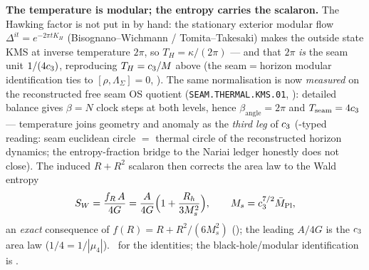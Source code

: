 \par\smallskip\noindent\textbf{The temperature is modular; the entropy carries the scalaron.}
 The Hawking factor is not put in by hand: the stationary exterior
modular flow $\Delta^{it}=e^{-2\pi t K_H}$ (Bisognano--Wichmann / Tomita--Takesaki) makes the outside state
KMS at inverse temperature $2\pi$, so $T_H=\kappa/(2\pi)$ --- and that $2\pi$ \emph{is} the seam unit
$1/(4c_3)$, reproducing $T_H=c_3/M$ above (the seam$=$horizon modular identification ties to
$[\rho,\Lambda_\Sigma]=0$, ).
The same normalisation is now \emph{measured} on the reconstructed free seam OS quotient
(\texttt{SEAM.THERMAL.KMS.01}, ): detailed balance
gives $\beta=N$ clock steps at both levels, hence $\beta_{\mathrm{angle}}=2\pi$ and
$T_{\mathrm{seam}}=4c_3$ --- temperature joins geometry and anomaly as the \emph{third leg}
of $c_3$ (\mC-typed reading: seam euclidean circle $=$ thermal circle of the reconstructed
horizon dynamics; the entropy-fraction bridge to the Nariai ledger honestly does not close).
The induced $R+R^2$ scalaron then
corrects the area law to the Wald entropy
\[
  S_W=\frac{f_R\,A}{4G}=\frac{A}{4G}\Bigl(1+\frac{R_h}{3M_s^2}\Bigr),\qquad M_s=c_3^{7/2}\bar M_{\mathrm{Pl}},
\]
an \emph{exact} consequence of $f(R)=R+R^2/(6M_s^2)$ (); the leading $A/4G$ is the
$c_3$ area law ($1/4=1/|\mu_4|$). \mE\ for the identities; the black-hole/modular identification is \mC.

